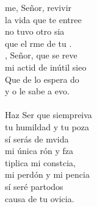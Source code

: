 \begin{cancion}%
	me, Señor, revivir \\
	la vida que te entree\\
	 no tuvo otro sia \\
	que el rme de tu .\\
	, Señor, que se reve \\
	mi actid de inútil sieo\\
	Que de lo espera do \\
	y o le sabe a evo.  \\
\jump\\
	Haz Ser que siempreiva \\
	tu humildad y tu poza\\
	sí serás de mvida \\
	mi única rón y fza\\
	tiplica mi constcia,\\
	mi perdón y mi pencia\\
	sí seré partodos \\
	causa de tu ovicia.\\
\end{cancion}%
